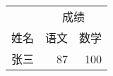 \begin{tabular}{|c|r|r|}
\hline
& \multicolumn{2}{c|}{成绩} \\ \cline{2-3}
姓名 & 语文 & 数学 \\ \hline
张三 & 87 & 100 \\ \hline
\end{tabular}
